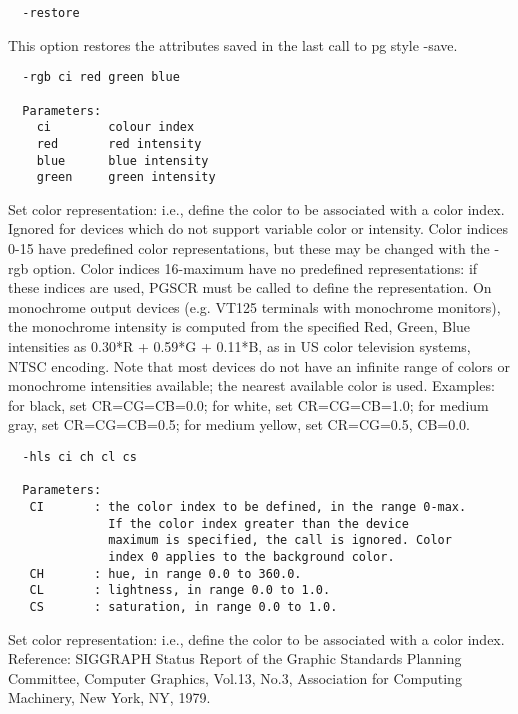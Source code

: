 \begin{verbatim}
  -restore
\end{verbatim}
This option restores the attributes saved in the last call to
pg style -save.
\begin{verbatim}
  -rgb ci red green blue

  Parameters:
    ci        colour index
    red       red intensity
    blue      blue intensity
    green     green intensity
\end{verbatim}
Set color representation: i.e., define the color to be
associated with a color index.  Ignored for devices which do not
support variable color or intensity.  Color indices 0-15
have predefined color representations, but these may be changed
with the -rgb option.  Color indices 16-maximum have no
predefined representations: if these indices are used, PGSCR must
be called to define the representation. On monochrome output
devices (e.g. VT125 terminals with monochrome monitors), the
monochrome intensity is computed from the specified Red, Green, Blue
intensities as 0.30*R + 0.59*G + 0.11*B, as in US color television
systems, NTSC encoding.  Note that most devices do not have an
infinite range of colors or monochrome intensities available;
the nearest available color is used.  Examples: for black,
set CR=CG=CB=0.0; for white, set CR=CG=CB=1.0; for medium gray,
set CR=CG=CB=0.5; for medium yellow, set CR=CG=0.5, CB=0.0.
\begin{verbatim}
  -hls ci ch cl cs

  Parameters:
   CI       : the color index to be defined, in the range 0-max.
              If the color index greater than the device
              maximum is specified, the call is ignored. Color
              index 0 applies to the background color.
   CH       : hue, in range 0.0 to 360.0.
   CL       : lightness, in range 0.0 to 1.0.
   CS       : saturation, in range 0.0 to 1.0.
\end{verbatim}
Set color representation: i.e., define the color to be
associated with a color index. 
Reference: SIGGRAPH Status Report of the Graphic Standards Planning
Committee, Computer Graphics, Vol.13, No.3, Association for
Computing Machinery, New York, NY, 1979.


